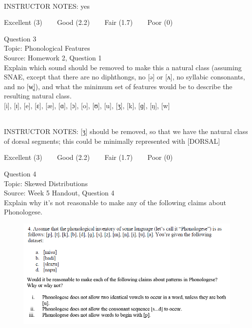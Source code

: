 \documentclass[12pt]{article}
\begin{document}
~\\
INSTRUCTOR NOTES: yes


\vfill
Excellent (3) ~~~ Good (2.2) ~~~ Fair (1.7) ~~~ Poor (0)
\newpage

{\large Question 3}\\

Topic: Phonological Features\\
Source: Homework 2, Question 1\\

Explain which sound should be removed to make this a natural class (assuming SNAE, except that there are no diphthongs, no [ə] or [ʌ], no syllabic consonants, and no [w̥]), and what the minimum set of features would be to describe the resulting natural class.\\

{[i]}, {[ɪ]}, {[e]}, {[ɛ]}, {[æ]}, {[ɑ]}, {[ɔ]}, {[o]}, {[ʊ]}, {[u]}, {[ʒ]}, {[k]}, {[ɡ]}, {[ŋ]}, {[w]}


~\\
INSTRUCTOR NOTES: [ʒ] should be removed, so that we have the natural class of dorsal segments; this could be minimally represented with [DORSAL]


\vfill
Excellent (3) ~~~ Good (2.2) ~~~ Fair (1.7) ~~~ Poor (0)
\newpage

{\large Question 4}\\

Topic: Skewed Distributions\\
Source: Week 5 Handout, Question 4\\

Explain why it's not reasonable to make any of the following claims about Phonologese.\\

\begin{figure}[H]
\includegraphics{../images/Phonologese.png}
\end{figure}
\end{document}
